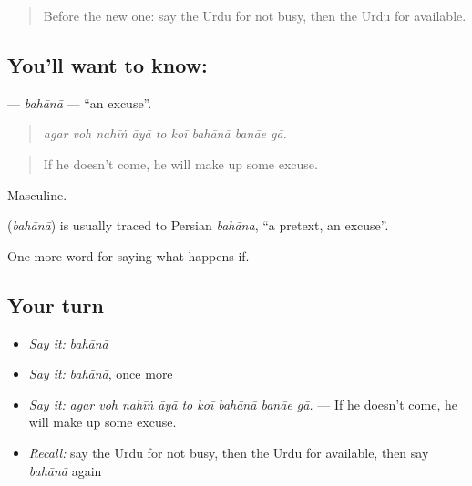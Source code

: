 \label{lesson:UR-C527-bahana}



\begin{quote}
Before the new one: say the Urdu for not busy, then the Urdu for available.
\end{quote}

\subsection*{You'll want to know: }
\textbf{} — \emph{bahānā} — \textquotedblleft{}an excuse\textquotedblright{}.

\begin{quote}
        
\end{quote}

\begin{quote}
\emph{agar voh nahīṅ āyā to koī bahānā banāe gā.}
\end{quote}

\begin{quote}
If he doesn't come, he will make up some excuse.
\end{quote}

Masculine.

\begin{cousinweb}
\textbf{} (\emph{bahānā}) is usually traced to Persian \emph{bahāna}, \textquotedblleft{}a pretext, an excuse\textquotedblright{}.
\end{cousinweb}

\begin{grammarlens}[title={What you've built}]
One more word for saying what happens if.
\end{grammarlens}

\subsection*{Your turn}
\begin{itemize}
\raggedright
  \item \emph{Say it:} \emph{bahānā}
  \item \emph{Say it:} \emph{bahānā}, once more
  \item \emph{Say it:} \emph{agar voh nahīṅ āyā to koī bahānā banāe gā.} — If he doesn't come, he will make up some excuse.
  \item \emph{Recall:} say the Urdu for not busy, then the Urdu for available, then say \emph{bahānā} again
\end{itemize}

